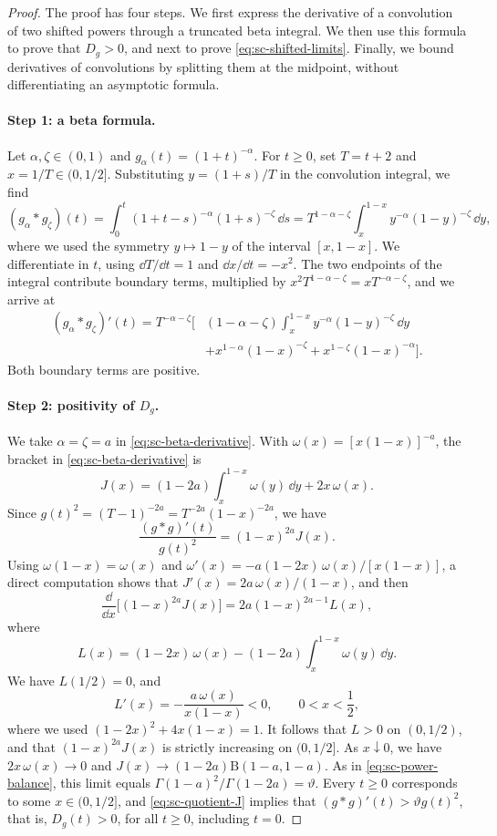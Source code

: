 \begin{proof}
The proof has four steps. We first express the derivative of a convolution of two shifted powers through a truncated beta integral. We then use this formula to prove that $D_g>0$, and next to prove \eqref{eq:sc-shifted-limits}. Finally, we bound derivatives of convolutions by splitting them at the midpoint, without differentiating an asymptotic formula.

\paragraph{Step 1: a beta formula.} Let $\alpha,\zeta\in(0,1)$ and $g_\alpha(t)=(1+t)^{-\alpha}$. For $t\ge0$, set $T=t+2$ and $x=1/T\in(0,1/2]$. Substituting $y=(1+s)/T$ in the convolution integral, we find
\[
 (g_\alpha*g_\zeta)(t)=\int_0^t(1+t-s)^{-\alpha}(1+s)^{-\zeta}\,\dd s
 =T^{1-\alpha-\zeta}\int_x^{1-x}y^{-\alpha}(1-y)^{-\zeta}\,\dd y,
\]
where we used the symmetry $y\mapsto1-y$ of the interval $[x,1-x]$. We differentiate in $t$, using $\dd T/\dd t=1$ and $\dd x/\dd t=-x^2$. The two endpoints of the integral contribute boundary terms, multiplied by $x^2T^{1-\alpha-\zeta}=xT^{-\alpha-\zeta}$, and we arrive at
\begin{align}
 (g_\alpha*g_\zeta)'(t)
 = T^{-\alpha-\zeta}\bigg[
 &(1-\alpha-\zeta)\int_x^{1-x}
             y^{-\alpha}(1-y)^{-\zeta}\,\dd y\nonumber\\
 &+x^{1-\alpha}(1-x)^{-\zeta}
  +x^{1-\zeta}(1-x)^{-\alpha}\bigg].
 \label{eq:sc-beta-derivative}
\end{align}
Both boundary terms are positive.

\paragraph{Step 2: positivity of $D_g$.} We take $\alpha=\zeta=a$ in \eqref{eq:sc-beta-derivative}. With $\omega(x)=[x(1-x)]^{-a}$, the bracket in \eqref{eq:sc-beta-derivative} is
\[
 J(x)=(1-2a)\int_x^{1-x}\omega(y)\,\dd y+2x\,\omega(x).
\]
Since $g(t)^2=(T-1)^{-2a}=T^{-2a}(1-x)^{-2a}$, we have
\begin{equation}\label{eq:sc-quotient-J}
 \frac{(g*g)'(t)}{g(t)^2}=(1-x)^{2a}J(x).
\end{equation}
Using $\omega(1-x)=\omega(x)$ and $\omega'(x)=-a(1-2x)\,\omega(x)/[x(1-x)]$, a direct computation shows that $J'(x)=2a\,\omega(x)/(1-x)$, and then
\[
 \frac{\dd}{\dd x}\bigl[(1-x)^{2a}J(x)\bigr]=2a(1-x)^{2a-1}L(x),
\]
where
\[
 L(x)=(1-2x)\,\omega(x)-(1-2a)\int_x^{1-x}\omega(y)\,\dd y .
\]
We have $L(1/2)=0$, and
\[
 L'(x)=-\frac{a\,\omega(x)}{x(1-x)}<0,\qquad 0<x<\frac12,
\]
where we used $(1-2x)^2+4x(1-x)=1$. It follows that $L>0$ on $(0,1/2)$, and that $(1-x)^{2a}J(x)$ is strictly increasing on $(0,1/2]$. As $x\downarrow0$, we have $2x\,\omega(x)\to0$ and $J(x)\to(1-2a)\mathrm B(1-a,1-a)$. As in \eqref{eq:sc-power-balance}, this limit equals $\Gamma(1-a)^2/\Gamma(1-2a)=\vartheta$. Every $t\ge0$ corresponds to some $x\in(0,1/2]$, and \eqref{eq:sc-quotient-J} implies that $(g*g)'(t)>\vartheta g(t)^2$, that is, $D_g(t)>0$, for all $t\ge0$, including $t=0$.


\end{proof}
